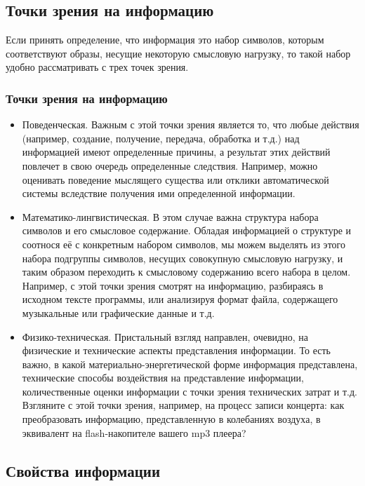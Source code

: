 \subsection{Точки зрения на информацию}


Если принять определение, что информация это набор символов, которым соответствуют образы, несущие некоторую смысловую нагрузку, то такой набор удобно рассматривать с трех точек зрения.

\begin{frame}
\frametitle{Точки зрения на информацию}
\begin{itemize}
    \item Поведенческая.
     {
        Важным с этой точки зрения является то, что любые действия (например, создание, получение, передача, обработка и т.д.) над информацией имеют определенные причины, а результат этих действий повлечет в свою очередь определенные следствия. Например, можно оценивать поведение мыслящего существа или отклики автоматической системы вследствие получения ими определенной информации.
    }
    
    \item Математико-лингвистическая.
     {
        В этом случае важна структура набора символов и его смысловое содержание. Обладая информацией о структуре и соотнося её с конкретным набором символов, мы можем выделять из этого набора подгруппы символов, несущих совокупную смысловую нагрузку, и таким образом переходить к смысловому содержанию всего набора в целом. Например, с этой точки зрения смотрят на информацию, разбираясь в исходном тексте программы, или анализируя формат файла, содержащего музыкальные или графические данные и т.д.
    }
    
    \item Физико-техническая.
     {
        Пристальный взгляд направлен, очевидно, на физические и технические аспекты представления информации. То есть важно, в какой материально-энергетической форме информация представлена, технические способы воздействия на представление информации, количественные оценки информации с точки зрения технических затрат и т.д. Взгляните с этой точки зрения, например, на процесс записи концерта: как преобразовать информацию, представленную в колебаниях воздуха, в эквивалент на flash-накопителе вашего mp3 плеера?
    }
\end{itemize}
\end{frame}


\subsection{Свойства информации}


